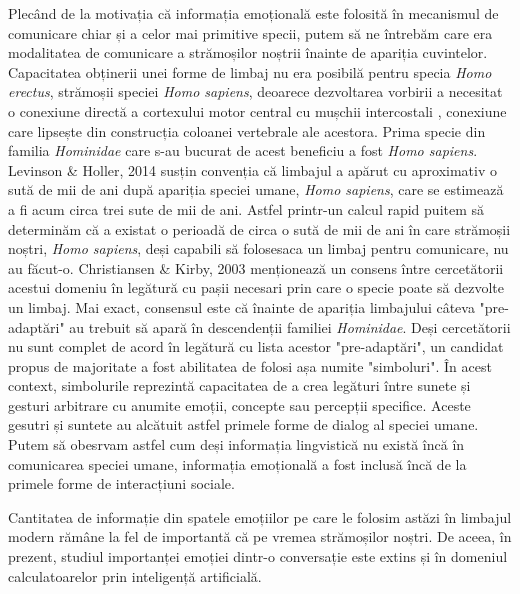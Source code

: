 \documentclass[a4paper,12pt]{book}
\begin{document}
				Plecând de la motivația că informația emoțională  este folosită în mecanismul de comunicare chiar și a celor mai primitive specii, putem să ne întrebăm care era modalitatea de comunicare a strămoșilor noștrii înainte de apariția cuvintelor. Capacitatea obținerii unei forme de limbaj nu era posibilă pentru specia \textit{Homo erectus}, strămoșii speciei \textit{Homo sapiens}, deoarece dezvoltarea vorbirii a necesitat o conexiune directă a cortexului motor central cu mușchii intercostali , conexiune care lipsește din construcția coloanei vertebrale ale acestora. Prima specie din familia \textit{Hominidae} care s-au bucurat de acest beneficiu a fost \textit{Homo sapiens}.  Levinson \& Holler, 2014 \cite{leviholler} susțin convenția că limbajul a apărut cu aproximativ o sută de mii de ani după apariția speciei umane, \textit{Homo sapiens}, care se estimează a fi acum circa trei sute de mii de ani. Astfel printr-un calcul rapid puitem să determinăm că a existat o perioadă de circa o sută de mii de ani în care strămoșii noștri, \textit{Homo sapiens}, deși capabili să folosesaca un limbaj pentru comunicare, nu au făcut-o. Christiansen \& Kirby, 2003 \cite{chriskirbi} menționează un consens între cercetătorii acestui domeniu în legătură cu pașii necesari prin care o specie poate să dezvolte un limbaj. Mai exact, consensul este că înainte de apariția limbajului câteva "pre-adaptări" au trebuit să apară în descendenții familiei \textit{Hominidae}. Deși cercetătorii nu sunt complet de acord în legătură cu lista acestor "pre-adaptări", un candidat propus de majoritate a fost abilitatea de folosi așa numite "simboluri". În acest context, simbolurile reprezintă capacitatea de a crea legături între sunete și gesturi arbitrare cu anumite emoții, concepte sau percepții specifice. Aceste gesutri și suntete au alcătuit astfel primele forme de dialog al speciei umane. Putem să obesrvam astfel cum deși informația lingvistică nu există încă în comunicarea speciei umane, informația emoțională a fost inclusă încă de la primele forme de interacțiuni sociale.\par 				
				Cantitatea de informație din spatele emoțiilor pe care le folosim astăzi în limbajul modern rămâne la fel de importantă că pe vremea strămoșilor noștri. De aceea, în prezent, studiul importanței emoției dintr-o conversație este extins și în domeniul calculatoarelor prin inteligență artificială. \par 	
				
\end{document}
